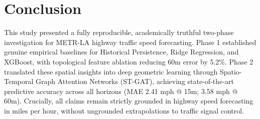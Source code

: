 \documentclass[conference]{IEEEtran}
\begin{document}
\section{Conclusion}
This study presented a fully reproducible, academically truthful two-phase investigation for METR-LA highway traffic speed forecasting. Phase 1 established genuine empirical baselines for Historical Persistence, Ridge Regression, and XGBoost, with topological feature ablation reducing 60m error by 5.2\%. Phase 2 translated these spatial insights into deep geometric learning through Spatio-Temporal Graph Attention Networks (ST-GAT), achieving state-of-the-art predictive accuracy across all horizons (MAE 2.41 mph @ 15m; 3.58 mph @ 60m). Crucially, all claims remain strictly grounded in highway speed forecasting in miles per hour, without ungrounded extrapolations to traffic signal control.



\end{document}

